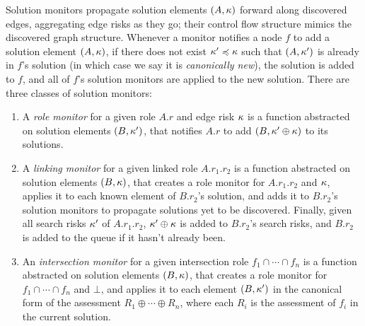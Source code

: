 Solution monitors propagate solution elements $(A,\kappa)$ forward
along discovered edges, aggregating edge risks as they go; their
control flow structure mimics the discovered graph structure.
Whenever a monitor notifies a node $f$ to add a solution element
$(A,\kappa)$, if there does not exist $\kappa' \preccurlyeq \kappa$ such that
$(A,\kappa')$ is already in $f$'s solution (in which case we
say it is \emph{canonically new}), the solution is added to $f$, 
and all of $f$'s solution
monitors are applied to the new solution.  There are three classes of
solution monitors:
\begin{enumerate}
  \item A \emph{role monitor} for a given role $A.r$ and 
edge risk $\kappa$ is a function abstracted on solution 
elements $(B,\kappa')$, that notifies $A.r$ to add
$(B,\kappa' \oplus \kappa)$ to its solutions.
  \item A \emph{linking monitor} for a given linked role $A.r_1.r_2$
is a function abstracted on solution elements $(B,\kappa)$, that
creates a role monitor for $A.r_1.r_2$ and $\kappa$, applies
it to each known element of $B.r_2$'s solution, and adds it to
$B.r_2$'s solution monitors to propagate solutions yet to be
discovered.  Finally, given all search risks $\kappa'$ of $A.r_1.r_2$,
$\kappa' \oplus \kappa$ is added to $B.r_2$'s search risks, and $B.r_2$
is added to the queue if it hasn't already been.
  \item An \emph{intersection monitor} for a given intersection role
$f_1 \cap \cdots \cap f_n$ is a function abstracted on solution
elements $(B,\kappa)$, that creates a role monitor for $f_1 \cap \cdots
\cap f_n$ and $\bot$, and applies it to each element 
$(B,\kappa')$ in the canonical form of the assessment $R_1 \oplus
\cdots \oplus R_n$, where each $R_i$ is the assessment of $f_i$ in the
current solution.
\end{enumerate}

